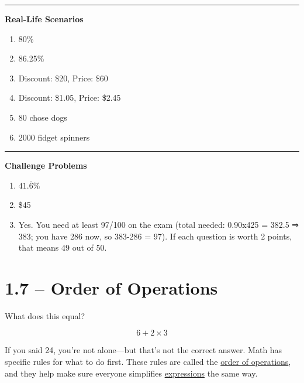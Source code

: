 \documentclass[
  letterpaper,
  DIV=11,
  numbers=noendperiod]{scrreprt}
\providecommand{\tightlist}{%
  \setlength{\itemsep}{0pt}\setlength{\parskip}{0pt}}
\begin{document}
\begin{center}\rule{0.5\linewidth}{0.5pt}\end{center}

\textbf{Real-Life Scenarios}

\begin{enumerate}
\def\labelenumi{\arabic{enumi}.}
\setcounter{enumi}{8}
\tightlist
\item
  80\%
\item
  86.25\%
\item
  Discount: \$20, Price: \$60
\item
  Discount: \$1.05, Price: \$2.45
\item
  80 chose dogs
\item
  2000 fidget spinners
\end{enumerate}

\begin{center}\rule{0.5\linewidth}{0.5pt}\end{center}

\textbf{Challenge Problems}

\begin{enumerate}
\def\labelenumi{\arabic{enumi}.}
\setcounter{enumi}{14}
\tightlist
\item
  \(41.\overline{6}\%\)
\item
  \$45
\item
  Yes. You need at least 97/100 on the exam (total needed: 0.90x425 =
  382.5 ⇒ 383; you have 286 now, so 383-286 = 97). If each question is
  worth 2 points, that means 49 out of 50.
\end{enumerate}

\chapter*{1.7 -- Order of Operations}\label{order-of-operations}


What does this equal?

\[
6 + 2 \times 3
\]

If you said 24, you're not alone---but that's not the correct answer.
Math has specific rules for what to do first. These rules are called the
\href{./glossary.html\#glossary-order-of-operations}{order of operations},
and they help make sure everyone simplifies
\href{./glossary.html\#glossary-expression}{expressions} the same way.
\end{document}
